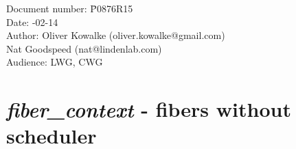 \documentclass[fontsize=10pt,paper=A4,pagesize,DIV=15]{scrartcl}
\begin{document}
\small
\begin{tabbing}
    Document number: \= P0876R15\\
    Date:            -02-14\\
    Author:          \> Oliver Kowalke (oliver.kowalke@gmail.com)\\
                     \> Nat Goodspeed (nat@lindenlab.com)\\
    Audience:        \> LWG, CWG\\
\end{tabbing}

\section*{\emph{fiber\_context} - fibers without scheduler}


\tableofcontents




\newpage























\end{document}
